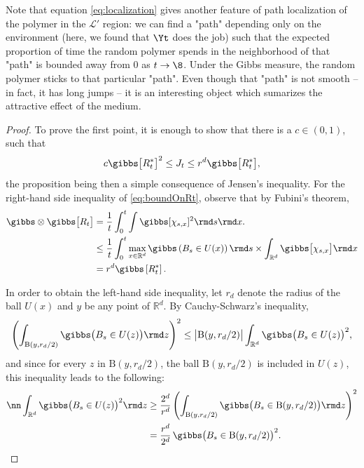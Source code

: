 \begin{remark}
Note that equation \eqref{eq:localization}  gives another feature of path localization of the polymer in the $\mathcal{L}'$ region: we can find a "path" depending only on the environment (here, we found that $\Yt$ does the job) such that the {\rm expected proportion of time the random polymer spends in the neighborhood of that "path" 
is bounded away from 0} as $t \to \8$. Under the Gibbs measure, the random polymer sticks to that particular "path". Even though that "path" is not smooth -- in fact, it has long jumps -- it is an interesting object which sumarizes the attractive effect  of the medium.
\end{remark}
\begin{proof}
To prove the first point, it is enough to show that there is a $c\in(0,1)$, such that
\begin{equation} \label{eq:boundOnRt}
c\gibbs\big[R_t^*\big]^2 \leq J_t \leq r^d\gibbs\big[R_t^*\big],
\end{equation}
the proposition being then a simple consequence of Jensen's inequality. 
For the right-hand side inequality of \eqref{eq:boundOnRt}, observe that by Fubini's theorem,
\begin{align*}
\gibbs\otimes\gibbs\big[R_t\big] &=\frac{1}{t}\int_0^t \int \gibbs[\chi_{s,x}]^2 \rmd s \rmd x.\\
& \leq \frac{1}{t}\int_0^t \max_{x\in\mathbb{R}^d} \gibbs\left( B_s \in U(x)\right)\rmd s \times \int_{\mathbb{R}^d} \gibbs\big[\chi_{s,x}\big] \rmd x\\
& = r^d \gibbs\left[ R_t^* \right].
\end{align*}

In order to obtain the left-hand side inequality, let $r_d$ denote the radius of the ball $U(x)$ and $y$ be any point of $\mathbb{R}^d$. By Cauchy-Schwarz's inequality,
\[\left(\int_{\mathrm{B}(y,r_d/2)}  \gibbs\big(B_s \in U(z) \big) \rmd z \right)^2 \leq \big|\mathrm{B}(y,r_d/2)\big| \int_{\mathbb{R}^d} \gibbs\big(B_s \in U(z)\big)^2,\]
and since for every $z$ in $\mathrm{B}(y,r_d/2)$, the ball $\mathrm{B}(y,r_d/2)$ is included in $U(z)$, this inequality leads to the following:
\begin{align}\nn
\int_{\mathbb{R}^d} \gibbs\big(B_s \in U(z)\big)^2 \rmd z &\geq \frac{2^d}{r^d} \left(\int_{\mathrm{B}(y,r_d/2)}  \gibbs\big(B_s \in \mathrm{B}(y,r_d/2) \big) \rmd z \right)^2\\
&= \frac{r^d}{2^d} \, \gibbs\big(B_s \in \mathrm{B}(y,r_d/2)\big)^2. \label{eq:num-1}
\end{align}


\end{proof}
